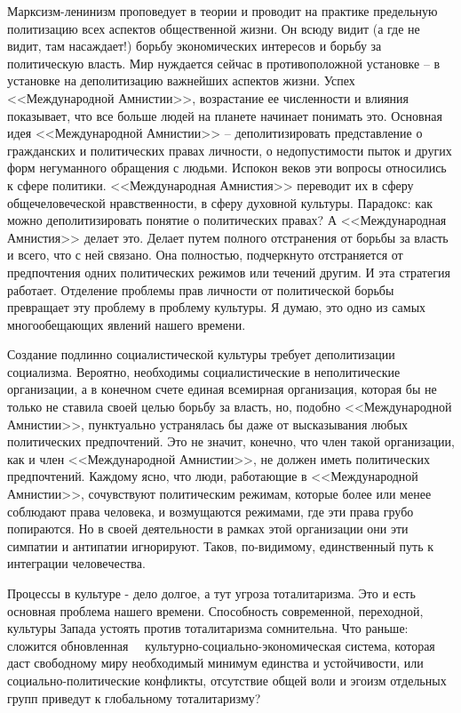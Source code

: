 \documentclass{book}
\begin{document}
Марксизм-ленинизм проповедует в теории и проводит на практике предельную политизацию всех аспектов обществен­ной жизни. Он всюду видит (а где не видит, там насаждает!) борьбу экономических интересов и борьбу за политическую власть. Мир нуждается сейчас в противоположной установке -- в установке на деполитизацию  важнейших аспектов жизни. Успех <<Международной Амнистии>>, возрастание ее численно­сти и влияния показывает, что все больше людей на планете начи­нает понимать это. Основная идея <<Международной Амнистии>> -- деполитизировать представление о гражданских и поли­тических правах личности, о недопустимости пыток и других форм негуманного обращения с людьми. Испокон веков эти вопросы относились к сфере политики. <<Международная Амни­стия>> переводит их в сферу общечеловеческой нравственности, в сферу духовной культуры. Парадокс: как можно деполитизи­ровать понятие о политических  правах? А <<Международная Амнистия>> делает это. Делает путем полного отстранения от борьбы за власть  и всего, что с ней связано. 
Она полностью, подчеркнуто отстраняется от предпочтения одних политиче­ских режимов или течений другим. И эта стратегия работает. Отделение проблемы прав личности от политической борьбы превращает эту проблему в проблему культуры. Я думаю, это одно из самых многообещающих явлений нашего времени.

Создание подлинно социалистической культуры требует деполитизации социализма. Вероятно, необходимы социалисти­ческие в неполитические  организации, а в конечном счете еди­ная всемирная организация, которая бы не только не ставила своей целью борьбу за власть, но, подобно <<Международной Амнистии>>, пунктуально устранялась бы даже от высказывания любых политических предпочтений. Это не значит, конеч­но, что член такой организации, как и член <<Международной Амнистии>>, не должен иметь  политических предпочтений. Каж­дому ясно, что люди, работающие в <<Международной Амни­стии>>, сочувствуют политическим режимам, которые более или менее соблюдают права человека, и возмущаются режимами, где эти права грубо попираются. Но в своей деятельности в рам­ках этой организации они эти симпатии и антипатии игнорируют. Таков, по-видимому, единственный путь к интеграции челове­чества.

Процессы в культуре - дело долгое, а тут угроза тоталита­ризма. Это и есть основная проблема нашего времени. Способ­ность современной, переходной, культуры Запада устоять против тоталитаризма сомнительна. Что раньше: сложится обновлен­ная   культурно-социально-экономическая система, которая даст свободному миру необходимый минимум единства и ус­тойчивости, или социально-политические конфликты, отсутст­вие общей воли и эгоизм отдельных групп приведут к глобаль­ному тоталитаризму?
\end{document}
